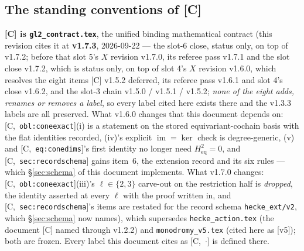 \documentclass[11pt]{article}
\theoremstyle{remark}
\DeclareMathOperator{\im}{im}
\newcommand{\HA}[1]{[C,~\texttt{#1}]}      %
\begin{document}
\subsection{The standing conventions of [C]}
\noindent\textbf{[C] is \texttt{gl2\_contract.tex}}, the unified binding mathematical contract
(this revision cites it at \textbf{v1.7.3}, 2026-09-22 --- the slot-6 close, status only, on top of
v1.7.2; before that slot 5's $X$ revision v1.7.0,
its referee pass v1.7.1 and the slot close v1.7.2, which is status only, on top of slot 4's
$X$ revision v1.6.0, which resolves the eight items [C] v1.5.2 deferred, its referee pass
v1.6.1 and slot 4's close v1.6.2, and the slot-3 chain v1.5.0 / v1.5.1 /
v1.5.2; \emph{none of the eight adds, renames or removes a label}, so every label cited here
exists there and the v1.3.3 labels are all preserved. What v1.6.0 changes that this
document depends on: \HA{obl:coneexact}(i) is a statement on the stored equivariant-cochain basis with
the flat identities recorded, (iv)'s explicit $\im=\ker$ check is degree-generic, (v) and
\HA{eq:conedims}'s first identity no longer need $H^2_{\mathrm{eq}}=0$, and
\HA{sec:recordschema} gains item~6, the extension record and its six rules --- which
\S\ref{sec:schema} of this document implements. What v1.7.0 changes: \HA{obl:coneexact}(iii)'s
$\ell\in\{2,3\}$ carve-out on the restriction half is \emph{dropped}, the identity asserted at
every $\ell$ with the proof written in, and \HA{sec:recordschema}'s items are restated for the
record schema \texttt{hecke\_ext/v2}, which \S\ref{sec:schema} now names),
which supersedes \texttt{hecke\_action.tex} (the document [C] named through v1.2.2) and
\texttt{monodromy\_v5.tex} (cited here as [v5]); both are frozen. Every label this document
cites as \HA{$\cdot$} is defined there.
\end{document}
